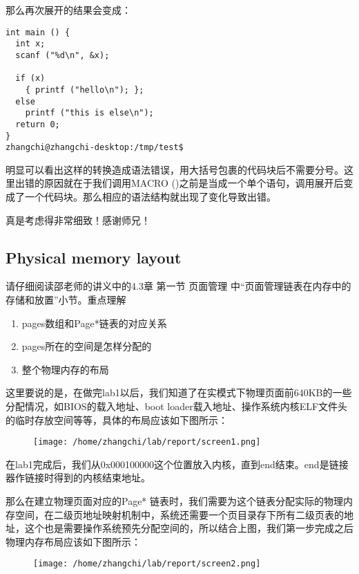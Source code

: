 \documentclass{article}
\newcommand{\funcname}[1]{{\ttfamily \small #1}}
\begin{document}
\begin{CJK*}{UTF8}{gkai}
那么再次展开的结果会变成：


\begin{lstlisting}[style=console]
int main () {
  int x;
  scanf ("%d\n", &x);

  if (x)
    { printf ("hello\n"); };
  else
    printf ("this is else\n");
  return 0;
}
zhangchi@zhangchi-desktop:/tmp/test$ 
\end{lstlisting}

明显可以看出这样的转换造成语法错误，用大括号包裹的代码块后不需要分号。这里出错的原因就在于我们调用\funcname{MACRO ()}之前是当成一个单个语句，调用展开后变成了一个代码块。那么相应的语法结构就出现了变化导致出错。

真是考虑得非常细致！感谢师兄！

\subsection{Physical memory layout}

请仔细阅读邵老师的讲义中的4.3章 第一节 页面管理 中``页面管理链表在内存中的存储和放置''小节。重点理解

\begin{enumerate}
\item{pages数组和Page*链表的对应关系}
\item{pages所在的空间是怎样分配的}
\item{整个物理内存的布局}
\end{enumerate}

这里要说的是，在做完lab1以后，我们知道了在实模式下物理页面前640KB的一些分配情况，如BIOS的载入地址、boot loader载入地址、操作系统内核ELF文件头的临时存放空间等等，具体的布局应该如下图所示：

\begin{figure}[htp]
\centering
\texttt{[image: /home/zhangchi/lab/report/screen1.png]}
\end{figure}

在lab1完成后，我们从0x000100000这个位置放入内核，直到end结束。end是链接器作链接时得到的内核结束地址。

那么在建立物理页面对应的Page* 链表时，我们需要为这个链表分配实际的物理内存空间，在二级页地址映射机制中，系统还需要一个页目录存下所有二级页表的地址，这个也是需要操作系统预先分配空间的，所以结合上图，我们第一步完成之后物理内存布局应该如下图所示：


\begin{figure}[htp]
\centering
\texttt{[image: /home/zhangchi/lab/report/screen2.png]}
\label{physmemlayout}
\end{figure}


\end{CJK*}
\end{document}

